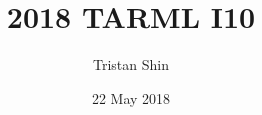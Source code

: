 \documentclass[a4paper, 12pt]{article}
\title{2018 TARML I10}
\author{Tristan Shin}
\date{22 May 2018}
\begin{document}
\maketitle



\hrulefill

\begin{solution}

\end{solution}
\end{document}
